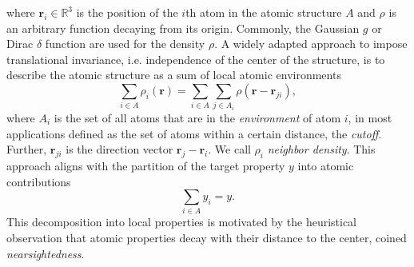where $\mathbf{r}_i\in\mathbb{R}^3$ is the position of the $i$th atom in the atomic structure $A$ and $\rho$ is an arbitrary function decaying from its origin. 
Commonly, the Gaussian $g$ or Dirac $\delta$ function are used for the density
$\rho$\cite{musil2021physics}.
A widely adapted approach to impose translational invariance, i.e. independence of the center of the structure, is to describe the atomic structure as a sum of local atomic environments
\begin{equation}
  \sum_{i\in A} \rho_i(\mathbf{r}) = \sum_{i\in A}\sum_{j\in A_i} \rho(\mathbf{r}-\mathbf{r}_{ji}),
\end{equation}
where $A_i$ is the set of all atoms that are in the \emph{environment} of atom
$i$, in most applications defined as the set of atoms within a certain distance, the
\emph{cutoff}. Further, $\mathbf{r}_{ji}$ is the direction vector $\mathbf{r}_j-\mathbf{r}_i$. 
We call $\rho_i$ \emph{neighbor density}.
This approach aligns with the partition of the target property $y$ into atomic contributions
\begin{equation}
  \label{eq:structural_separation}
  \sum_{i\in A} y_i = y.
\end{equation}
This decomposition into local properties is motivated by the heuristical observation that atomic properties decay with their distance to the center, coined \emph{nearsightedness}\cite{prodan2005nearsightedness}.
